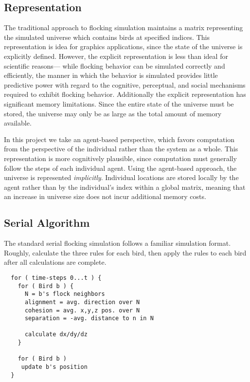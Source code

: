 \subsection*{Representation}
The traditional approach to flocking simulation maintains a matrix
representing the simulated universe which contains birds at specified
indices. This representation is idea for graphics applications, since
the state of the universe is explicitly defined. However, the explicit
representation is less than ideal for scientific reasons--- while
flocking behavior can be simulated correctly and efficiently, the
manner in which the behavior is simulated provides little predictive
power with regard to the cognitive, perceptual, and social mechanisms
required to exhibit flocking behavior. Additionally the explicit
representation has significant memory limitations. Since the entire
state of the universe must be stored, the universe may only be as
large as the total amount of memory available.

In this project we take an agent-based perspective, which favors
computation from the perspective of the individual rather than the
system as a whole. This representation is more cognitively plausible,
since computation must generally follow the steps of each individual
agent. Using the agent-based approach, the universe is represented
\emph{implicitly}. Individual locations are stored locally by the
agent rather than by the individual's index within a global matrix,
meaning that an increase in universe size does not incur additional
memory costs. 

\subsection*{Serial Algorithm}
The standard serial flocking simulation follows a familiar simulation
format. Roughly, calculate the three rules for each bird, then apply
the rules to each bird after all calculations are complete.

\newpage
\begin{verbatim}
  for ( time-steps 0...t ) {
    for ( Bird b ) {
      N = b's flock neighbors
      alignment = avg. direction over N
      cohesion = avg. x,y,z pos. over N
      separation = -avg. distance to n in N

      calculate dx/dy/dz
    }

    for ( Bird b )
     update b's position
  }
\end{verbatim}

